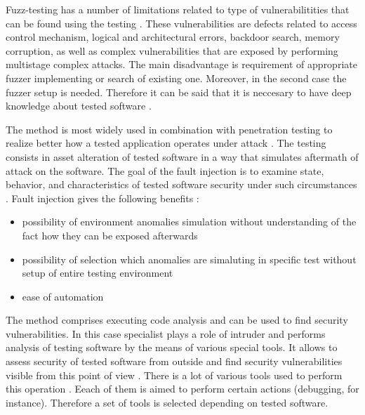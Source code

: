 %
Fuzz-testing has a number of limitations related to type of vulnerabilitities that can be found using the testing . 
%
These vulnerabilities are defects related to access control mechanism, logical and architectural errors, backdoor search, memory corruption, as well as complex vulnerabilities that are exposed by performing multistage complex attacks. 
%
The main disadvantage is requirement of appropriate fuzzer implementing or search of existing one. 
%
Moreover, in the second case the fuzzer setup is needed. 
%
Therefore it can be said that it is neccesary to have deep knowledge about tested software . 



%
The method is most widely used in combination with penetration testing to realize better how a tested application operates under attack . 
%
The testing consists in asset alteration of tested software in a way that simulates aftermath of attack on the software. 
%
The goal of the fault injection is to examine state, behavior, and characteristics of tested software security under such circumstances . 
%
Fault injection gives the following benefits :
\begin{itemize}
	\leftskip2em%
	\setlength{\itemsep}{0pt}%
	\setlength{\parsep}{0pt}%

	\item possibility of environment anomalies simulation without understanding of the fact how they can be exposed afterwards
	\item possibility of selection which anomalies are simaluting in \A specific test without setup of entire testing environment
	\item ease of automation
\end{itemize}



%
The method comprises executing code analysis and can be used to find security vulnerabilities. 
%
In this case specialist plays a role of intruder and performs analysis of testing software by the means of various special tools. 
%
It allows to assess security of tested software from outside and find security vulnerabilities visible from this point of view . 
%
There is a lot of various tools used to perform this operation . 
%
Eeach of them is aimed to perform certain actions (debugging, for instance). 
%
Therefore a set of tools is selected depending on tested software. 

